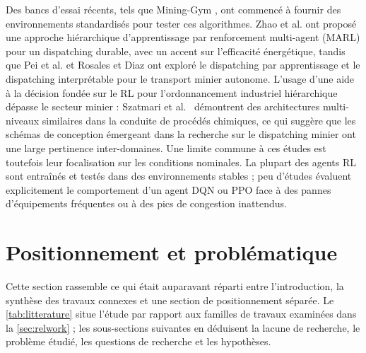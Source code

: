 \documentclass[11pt,a4paper]{article}
\newif\ifrevmarks
\newcommand{\revtag}[1]{\ifrevmarks\textsuperscript{\textcolor{red!70!black}{\scriptsize[#1]}}\fi}
\newenvironment{revbloc}[1]{\par\ifrevmarks\color{revcolor}\noindent\revtag{#1}\ \fi}{\par}
\begin{document}
Des bancs d'essai récents, tels que Mining-Gym \cite{Banerjee2025}, ont commencé à fournir des environnements standardisés pour tester ces algorithmes. Zhao et al. \cite{Zhao2025} ont proposé une approche hiérarchique d'apprentissage par renforcement multi-agent (MARL) pour un dispatching durable, avec un accent sur l'efficacité énergétique, tandis que Pei et al. \cite{Pei2025} et Rosales et Diaz \cite{FranciscoRosales2025} ont exploré le dispatching par apprentissage et le dispatching interprétable pour le transport minier autonome. L'usage d'une aide à la décision fondée sur le RL pour l'ordonnancement industriel hiérarchique dépasse le secteur minier : Szatmari et al.~\cite{KingaSzatmari2025} démontrent des architectures multi-niveaux similaires dans la conduite de procédés chimiques, ce qui suggère que les schémas de conception émergeant dans la recherche sur le dispatching minier ont une large pertinence inter-domaines. Une limite commune à ces études est toutefois leur focalisation sur les conditions nominales. La plupart des agents RL sont entraînés et testés dans des environnements stables ; peu d'études évaluent explicitement le comportement d'un agent DQN ou PPO face à des pannes d'équipements fréquentes ou à des pics de congestion inattendus.

\section{Positionnement et problématique}
\label{sec:positioning}

\begin{revbloc}{M24}
Cette section rassemble ce qui était auparavant réparti entre l'introduction, la synthèse des travaux connexes et une section de positionnement séparée. Le \cref{tab:litterature} situe l'étude par rapport aux familles de travaux examinées dans la \cref{sec:relwork} ; les sous-sections suivantes en déduisent la lacune de recherche, le problème étudié, les questions de recherche et les hypothèses.
\end{revbloc}
\end{document}
